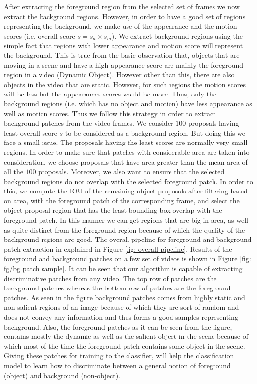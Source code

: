 \documentclass[10pt,twocolumn,letterpaper]{article}
\begin{document}
After extracting the foreground region from the selected set of frames we now extract the background regions. However, in order to have a good set of regions representing the background, we make use of the appearance and the motion scores (i.e. overall score $s=s_{a}\times s_{m}$). We extract background regions using the simple fact that regions with lower appearance and motion score will represent the background. This is true from the basic observation that, objects that are moving in a scene and have a high appearance score are mainly the foreground region in a video (Dynamic Object). However other than this, there are also objects in the video that are static. However, for such regions the motion scores will be less but the appearances scores would be more. Thus, only the background regions (i.e. which has no object and motion) have less appearance as well as motion scores. Thus we follow this strategy in order to extract background patches from the video frames. We consider $100$ proposals having least overall score $s$ to be considered as a background region. But doing this we face a small issue. The proposals having the least scores are normally very small regions. In order to make sure that patches with considerable area are taken into consideration, we choose proposals that have area greater than the mean area of all the $100$ proposals. Moreover, we also want to ensure that the selected background regions do not overlap with the selected foreground patch. In order to this, we compute the IOU of the remaining object proposals after filtering based on area, with the foreground patch of the corresponding frame, and select the object proposal region that has the least bounding box overlap with the foreground patch. In this manner we can get regions that are big in area, as well as quite distinct from the foreground region because of which the quality of the background regions are good. The overall pipeline for foreground and background patch extraction in explained in Figure \ref{fig: overall pipeline}. Results of the foreground and background patches on a few set of videos is shown in Figure \ref{fig: fg/bg patch sample}. It can be seen that our algorithm is capable of extracting discriminative patches from any video. The top row of patches are the background patches whereas the bottom row of patches are the foreground patches. As seen in the figure background patches comes from highly static and non-salient regions of an image because of which they are sort of random and does not convey any information and thus forms a good samples representing background. Also, the foreground patches as it can be seen from the figure, contains mostly the dynamic as well as the salient object in the scene because of which most of the time the foreground patch contains some object in the scene. Giving these patches for training to the classifier, will help the classification model to learn how to discriminate between a general notion of foreground (object) and background (non-object). 
\end{document}
